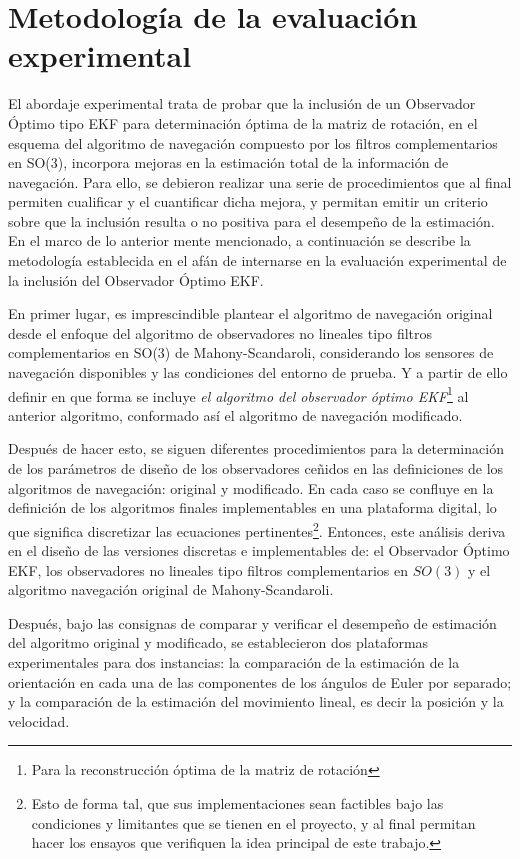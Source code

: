 \documentclass[conference]{IEEEtran}
\begin{document}
\section{Metodología de la evaluación experimental}\label{Metodologia}
El abordaje experimental trata de probar que la inclusión de un Observador Óptimo tipo EKF para determinación óptima de la matriz de rotación, en el esquema del algoritmo de navegación compuesto por los filtros complementarios en SO(3), incorpora mejoras en la estimación total de la información de navegación. Para ello, se debieron realizar una serie de procedimientos que al final permiten cualificar y el cuantificar dicha mejora, y permitan emitir un criterio sobre que la inclusión resulta o no positiva para el desempeño de la estimación. En el marco de lo anterior mente mencionado, a continuación se describe la metodología establecida en el afán de internarse en la evaluación experimental de la inclusión del Observador Óptimo EKF.\par
En primer lugar, es imprescindible plantear el algoritmo de navegación original desde el enfoque del algoritmo de observadores no lineales tipo filtros complementarios en SO(3) de Mahony-Scandaroli, considerando los sensores de navegación disponibles y las condiciones del entorno de prueba. Y a partir de ello definir en que forma se incluye \emph{el algoritmo del observador óptimo EKF}\footnote{Para la reconstrucción óptima de la matriz de rotación} al anterior algoritmo, conformado así el algoritmo de navegación modificado.\par
Después de hacer esto, se siguen diferentes procedimientos para la determinación de los parámetros de diseño de los observadores ceñidos en las definiciones de los algoritmos de navegación: original y modificado. En cada caso se confluye en la definición de los algoritmos finales implementables en una plataforma digital, lo que significa discretizar las ecuaciones pertinentes\footnote{ Esto de forma tal, que sus implementaciones sean factibles bajo las condiciones y limitantes que se tienen en el proyecto, y al final permitan hacer los ensayos que verifiquen la idea principal de este trabajo.}. Entonces, este análisis deriva en el diseño de las versiones discretas e implementables de: el Observador Óptimo EKF, los observadores no lineales tipo filtros complementarios en $SO(3)$ y el algoritmo navegación original de Mahony-Scandaroli.\par
Después, bajo las consignas de comparar y verificar el desempeño de estimación del algoritmo original y modificado, se establecieron dos plataformas experimentales para dos instancias: la comparación de la estimación de la orientación en cada una de las componentes de los ángulos de Euler por separado; y la comparación de la estimación del movimiento lineal, es decir la posición y la velocidad.\par
\end{document}
